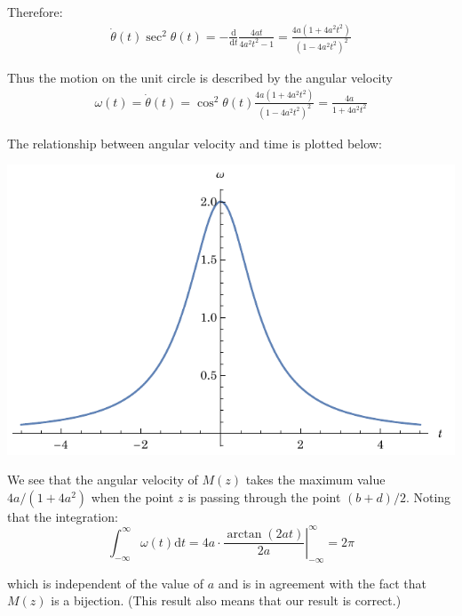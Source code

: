 \documentclass[]{ctexart}
\begin{document}
		Therefore:
			\begin{equation*}
			\begin{aligned}
			\dot{\theta}(t) \sec ^{2} \theta(t)=-\frac{\mathrm{d}}{\mathrm{d} t} \frac{4 a t}{4 a^{2} t^{2}-1}=\frac{4 a\left(1+4 a^{2} t^{2}\right)}{\left(1-4 a^{2} t^{2}\right)^{2}}
			\end{aligned}
			\end{equation*}
		
		Thus the motion on the unit circle is described by the angular velocity
			\begin{equation*}
			\begin{aligned}
				\omega(t)=\dot{\theta}(t)=\cos ^{2} \theta(t) \frac{4 a\left(1+4 a^{2} t^{2}\right)}{\left(1-4 a^{2} t^{2}\right)^{2}}=\frac{4 a}{1+4 a^{2} t^{2}}
			\end{aligned}
			\end{equation*}
		
		The relationship between angular velocity and time is plotted below:
			\begin{center}
				\includegraphics[scale=1]{velocity-of-the-point.pdf}
			\end{center}
		
		We see that the angular velocity of $M(z)$ takes the maximum value $4 a /\left(1+4 a^{2}\right)$ when the point $z$ is passing through the point $(b+d) / 2 .$ Noting that the integration:
			\begin{equation*}
			\int_{-\infty}^{\infty} \omega(t) \mathrm{d} t=\left.4 a \cdot \frac{\arctan (2 a t)}{2 a}\right|_{-\infty} ^{\infty}=2 \pi
			\end{equation*}

		which is independent of the value of $a$ and is in agreement with the fact that $M(z)$ is a bijection. (This
		result also means that our result is correct.)
		
\end{document}
